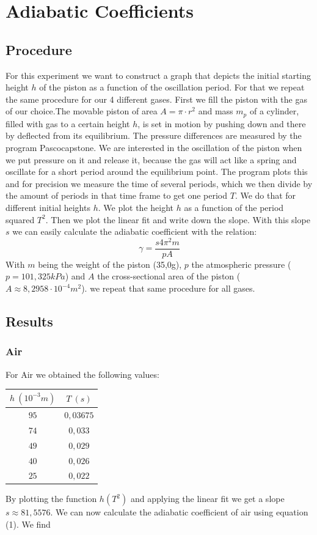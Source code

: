 \documentclass{scrartcl}
\begin{document}
\section{Adiabatic Coefficients}

\subsection{Procedure}

For this experiment we want to construct a graph that depicts the initial starting height $h$ of the piston as a function of the oscillation period. For that we repeat the same procedure for our 4 different gases.
First we fill the piston with the gas of our choice.The movable piston of area $A=\pi \cdot r^2$ and mass $m_p$ of a cylinder, filled with gas to a certain height $h$, is set in motion by pushing down and there by deflected from its equilibrium. The pressure differences are measured by the program Pascocapstone. We are interested in the oscillation of the piston when we put pressure on it and release it, because the gas will act like a spring and oscillate for a short period around the equilibrium point. The program plots this and for precision we measure the time of several periods, which we then divide by the amount of periods in that time frame to get one period $T$. We do that for different initial heights $h$.
We plot the height $h$ as a function of the period squared $T^2$. Then we plot the linear fit and write down the slope.
With this slope $s$ we can easily calculate the adiabatic coefficient with the relation:
\begin{equation}
\gamma=\frac{s4\pi^2 m}{pA}
\end{equation}
With $m$ being the weight of the piston (35,0g), $p$ the atmospheric pressure ($p=101,325kPa$) and $A$ the cross-sectional area of the piston ($A\approx8,2958\cdot10^{-4}m^2$).
we repeat that same procedure for all gases.

\subsection{Results}

\subsubsection{Air}
For Air we obtained the following values:

\medskip
\centering
\begin{tabular}{|c|c|}
    \hline
     $h  \ (10^{-3}m) $& $T  \ (s)$  \\
     \hline
     $95$ & $0,03675$ \\
     \hline
     $74$ & $0,033$ \\
     \hline
     $49$ & $0,029$ \\
     \hline
     $40$ & $0,026$ \\
     \hline
     $25$ & $0,022$ \\
     \hline
\end{tabular}
\flushleft
By plotting the function $h(T^2)$ and applying the linear fit we get a slope $s\approx81,5576$. We can now calculate the adiabatic coefficient of air using equation (1). We find 
\end{document}
